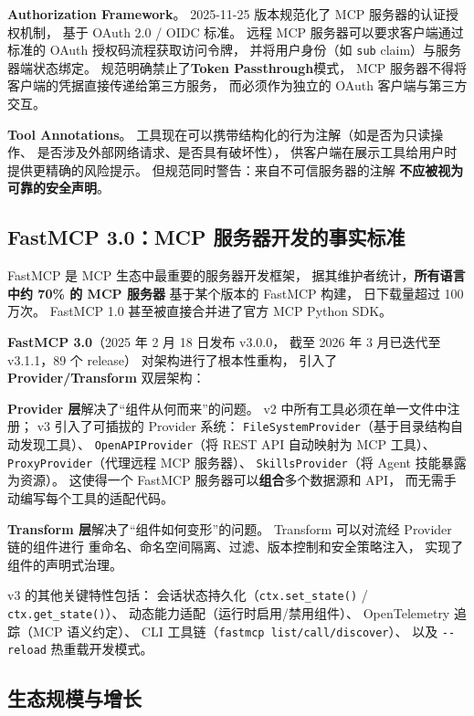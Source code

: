 \textbf{Authorization Framework}。
2025-11-25 版本规范化了 MCP 服务器的认证授权机制，
基于 OAuth 2.0 / OIDC 标准。
远程 MCP 服务器可以要求客户端通过
标准的 OAuth 授权码流程获取访问令牌，
并将用户身份（如 \texttt{sub} claim）与服务器端状态绑定。
规范明确禁止了\textbf{Token Passthrough}模式，
MCP 服务器不得将客户端的凭据直接传递给第三方服务，
而必须作为独立的 OAuth 客户端与第三方交互。

\textbf{Tool Annotations}。
工具现在可以携带结构化的行为注解（如是否为只读操作、
是否涉及外部网络请求、是否具有破坏性），
供客户端在展示工具给用户时提供更精确的风险提示。
但规范同时警告：来自不可信服务器的注解
\textbf{不应被视为可靠的安全声明}。

\subsection{FastMCP 3.0：MCP 服务器开发的事实标准}

FastMCP 是 MCP 生态中最重要的服务器开发框架，
据其维护者统计，\textbf{所有语言中约 70\% 的 MCP 服务器}
基于某个版本的 FastMCP 构建，
日下载量超过 100 万次。
FastMCP 1.0 甚至被直接合并进了官方 MCP Python SDK。

\textbf{FastMCP 3.0}（2025 年 2 月 18 日发布 v3.0.0，
截至 2026 年 3 月已迭代至 v3.1.1，89 个 release）
对架构进行了根本性重构，
引入了 \textbf{Provider/Transform} 双层架构：

\textbf{Provider 层}解决了“组件从何而来”的问题。
v2 中所有工具必须在单一文件中注册；
v3 引入了可插拔的 Provider 系统：
\texttt{FileSystemProvider}（基于目录结构自动发现工具）、
\texttt{OpenAPIProvider}（将 REST API 自动映射为 MCP 工具）、
\texttt{ProxyProvider}（代理远程 MCP 服务器）、
\texttt{SkillsProvider}（将 Agent 技能暴露为资源）。
这使得一个 FastMCP 服务器可以\textbf{组合}多个数据源和 API，
而无需手动编写每个工具的适配代码。

\textbf{Transform 层}解决了“组件如何变形”的问题。
Transform 可以对流经 Provider 链的组件进行
重命名、命名空间隔离、过滤、版本控制和安全策略注入，
实现了组件的声明式治理。

v3 的其他关键特性包括：
会话状态持久化（\texttt{ctx.set\_state()} / \texttt{ctx.get\_state()}）、
动态能力适配（运行时启用/禁用组件）、
OpenTelemetry 追踪（MCP 语义约定）、
CLI 工具链（\texttt{fastmcp list/call/discover}）、
以及 \texttt{-{}-reload} 热重载开发模式。

\subsection{生态规模与增长}

